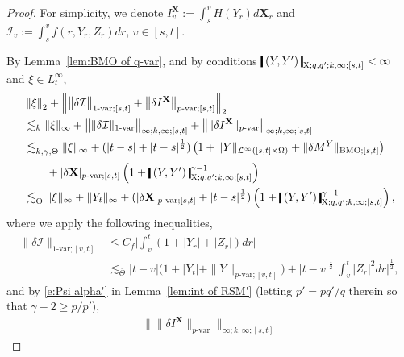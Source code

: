 \documentclass[11pt,reqno]{amsart}
\numberwithin{equation}{section}
\newcommand{\shortthickbar}{%
  \vcenter{\hbox{\rule{1.8pt}{2.2ex}}}%
}
\newcommand{\thicknm}[1]{%
  \mathopen{\shortthickbar}%
  \mkern4mu #1 \mkern4mu%
  \mathclose{\shortthickbar}%
}
\begin{document}
\begin{proof}
For simplicity, we denote $I^{\mathbf X}_v := \int_s^v H(Y_r) d\mathbf X_r$ and $\mathcal I_v := \int_{s}^v f(r,Y_r,Z_r) dr$, $v \in [s,t]$. 	

By Lemma~\ref{lem:BMO of q-var}, and by conditions $\thicknm{(Y,Y')}_{\mathrm X;q,q';k,\infty;[s,t]} < \infty$ and $\xi \in L^{\infty}_{t}$,  
\begin{equation}\label{e:xi Gamma Gamma}
\begin{aligned}
&\left\|\xi\right\|_2 + \Big\| \big\| \delta \mathcal I \big\|_{1\text{-}\mathrm{var};[s,t]} + \big\|\delta I^{\mathbf X} \big\|_{p\text{-var};[s,t]} \Big\|_{2} \\
&\lesssim_k \|\xi\|_{\infty} + \big\| \|\delta \mathcal I\|_{1\text{-}\mathrm{var}} \big\|_{\infty;k,\infty;[s,t]} + \big\| \| \delta I^{\mathbf X}\|_{p\text{-}\mathrm{var}} \big\|_{\infty;k,\infty;[s,t]} \\ 
&\lesssim_{k,\gamma,\bar \Theta} \|\xi\|_{\infty} + (|t - s| + |t - s|^{\frac{1}{2}}) \left(1 + \|Y\|_{\mathcal L^{\infty}([s,t] \times \Omega)} + \|\delta M^Y\|_{\mathrm{BMO};[s,t]} \right) \\[1mm]
&\quad\quad +|\delta \mathbf X|_{p\text{-}\mathrm{var};[s,t]} \left( 1 + \thicknm{(Y,Y')}^{\gamma - 1}_{\mathrm X;q,q';k,\infty;[s,t]} \right)\\
&\lesssim_{\bar \Theta} \|\xi\|_{\infty}  + \|Y_t\|_{\infty}+ (|\delta \mathbf X|_{p\text{-}\mathrm{var};[s,t]} + |t - s|^{\frac{1}{2}}) \left( 1 + \thicknm{(Y,Y')}^{\gamma - 1}_{\mathrm X;q,q';k,\infty;[s,t]} \right),
\end{aligned}
\end{equation}
where we apply the following inequalities,
\begin{equation}\label{e:mathcal I <=}
\begin{aligned}		
\big\|\delta \mathcal I \big\|_{1\text{-}\mathrm{var};[v,t]} &\le C_f \Big|\int_{v}^{t} ( 1+|Y_{r}|+|Z_{r}| )dr\Big|\\
&\lesssim_{\bar \Theta} |t - v|\Big(1 + |Y_t| + \|Y\|_{p\text{-}\mathrm{var};[v,t]}\Big) + |t -  v|^{\frac{1}{2}} \Big|\int_{v}^{t}|Z_{r}|^{2}dr\Big|^{\frac{1}{2}},
\end{aligned}
\end{equation}
and by \eqref{e:Psi alpha'} in Lemma~\ref{lem:int of RSM'} (letting $p' = pq'/q$ therein so that $\gamma - 2 \ge p/p'$), 
\begin{equation*}
\begin{aligned}
\big\| \big\|\delta I^{\mathbf X} \big\|_{p\text{-var}} \big\|_{\infty;k,\infty;[s,t]} 

\end{aligned}
\end{equation*}
\end{proof}
\end{document}
